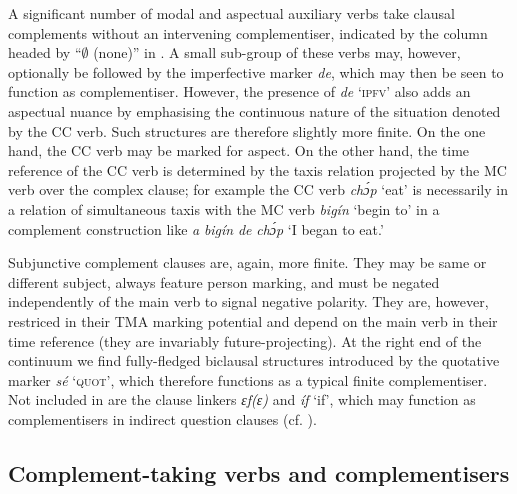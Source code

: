 A significant number of modal and aspectual auxiliary verbs take clausal complements without an intervening complementiser, indicated by the column headed by “${\emptyset}$ (none)” in . A small sub-group of these verbs may, however, optionally be followed by the imperfective marker \textit{de}, which may then be seen to function as complementiser. However, the presence of \textit{de} \textsc{‘ipfv’} also adds an aspectual nuance by emphasising the continuous nature of the situation denoted by the CC verb. Such structures are therefore slightly more finite. On the one hand, the CC verb may be marked for aspect. On the other hand, the time reference of  the CC verb is determined by the taxis relation projected by the MC verb over the complex clause; for example the CC verb \textit{chɔ́p} ‘eat’ is necessarily in a relation of simultaneous taxis with the MC verb \textit{bigín} ‘begin to’ in a complement construction like \textit{a} \textit{bigín} \textit{de} \textit{chɔ́p} ‘I began to eat.’



Subjunctive complement clauses are, again, more finite. They may be same or different subject, always feature person marking, and must be negated independently of the main verb to signal negative polarity. They are, however, restriced in their TMA marking potential and depend on the main verb in their time reference (they are invariably future-projecting). At the right end of the continuum we find fully-fledged biclausal structures introduced by the quotative marker \textit{sé} ‘\textsc{quot}’, which therefore functions as a typical finite complementiser. Not included in  are the clause linkers \textit{ɛf(ɛ)} and\textit{ íf} ‘if’, which may function as complementisers in indirect question clauses (cf. ).


\subsection{Complement-taking verbs and complementisers}

